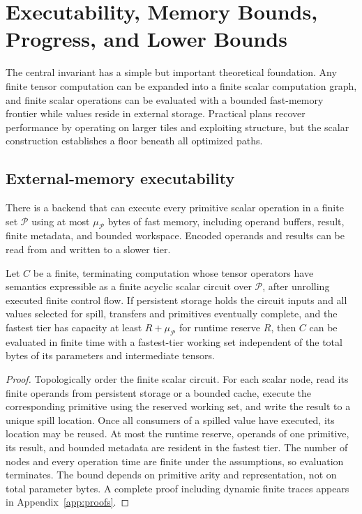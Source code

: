 \section{Executability, Memory Bounds, Progress, and Lower Bounds}
\label{sec:theory}

The central invariant has a simple but important theoretical foundation. Any finite tensor computation can be expanded into a finite scalar computation graph, and finite scalar operations can be evaluated with a bounded fast-memory frontier while values reside in external storage. Practical \AMS plans recover performance by operating on larger tiles and exploiting structure, but the scalar construction establishes a floor beneath all optimized paths.

\subsection{External-memory executability}

\begin{assumption}
\label{ass:primitive}
There is a backend that can execute every primitive scalar operation in a finite set $\mathcal P$ using at most $\mu_{\mathcal P}$ bytes of fast memory, including operand buffers, result, finite metadata, and bounded workspace. Encoded operands and results can be read from and written to a slower tier.
\end{assumption}

\begin{theorem}
\label{thm:external-eval}
Let $C$ be a finite, terminating computation whose tensor operators have semantics expressible as a finite acyclic scalar circuit over $\mathcal P$, after unrolling executed finite control flow. If persistent storage holds the circuit inputs and all values selected for spill, transfers and primitives eventually complete, and the fastest tier has capacity at least $R+\mu_{\mathcal P}$ for runtime reserve $R$, then $C$ can be evaluated in finite time with a fastest-tier working set independent of the total bytes of its parameters and intermediate tensors.
\end{theorem}

\begin{proof}
Topologically order the finite scalar circuit. For each scalar node, read its finite operands from persistent storage or a bounded cache, execute the corresponding primitive using the reserved working set, and write the result to a unique spill location. Once all consumers of a spilled value have executed, its location may be reused. At most the runtime reserve, operands of one primitive, its result, and bounded metadata are resident in the fastest tier. The number of nodes and every operation time are finite under the assumptions, so evaluation terminates. The bound depends on primitive arity and representation, not on total parameter bytes. A complete proof including dynamic finite traces appears in Appendix~\ref{app:proofs}.
\end{proof}

